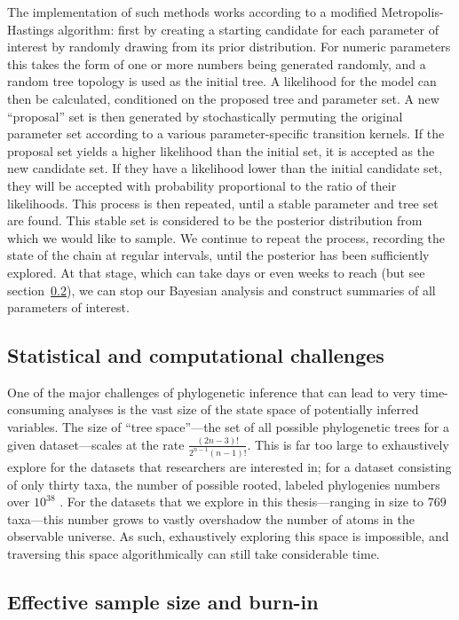 The implementation of such methods works according to a modified Metropolis-Hastings algorithm: first by creating a starting candidate for each parameter of interest by randomly drawing from its prior distribution.
For numeric parameters this takes the form of one or more numbers being generated randomly, and a random tree topology is used as the initial tree.
A likelihood for the model can then be calculated, conditioned on the proposed tree and parameter set.
A new ``proposal'' set is then generated by stochastically permuting the original parameter set according to a various parameter-specific transition kernels.
If the proposal set yields a higher likelihood than the initial set, it is accepted as the new candidate set.
If they have a likelihood lower than the initial candidate set, they will be accepted with probability proportional to the ratio of their likelihoods.
This process is then repeated, until a stable parameter and tree set are found.
This stable set is considered to be the posterior distribution from which we would like to sample.
We continue to repeat the process, recording the state of the chain at regular intervals, until the posterior has been sufficiently explored.
At that stage, which can take days or even weeks to reach (but see section~\ref{sec:ess}), we can stop our Bayesian analysis and construct summaries of all parameters of interest.

\subsection{Statistical and computational challenges}

One of the major challenges of phylogenetic inference that can lead to very time-consuming analyses is the vast size of the state space of potentially inferred variables.
The size of ``tree space''---the set of all possible phylogenetic trees for a given dataset---scales at the rate $\frac{(2n-3)!}{2^{n-1}(n-1)!}$.
This is far too large to exhaustively explore for the datasets that researchers are interested in; for a dataset consisting of only thirty taxa, the number of possible rooted, labeled phylogenies numbers over $10^{38}$ \cite{felsenstein2003inferring}.
For the datasets that we explore in this thesis---ranging in size to 769 taxa---this number grows to vastly overshadow the number of atoms in the observable universe.
As such, exhaustively exploring this space is impossible, and traversing this space algorithmically can still take considerable time.


\subsection{Effective sample size and burn-in}
\label{sec:ess}


